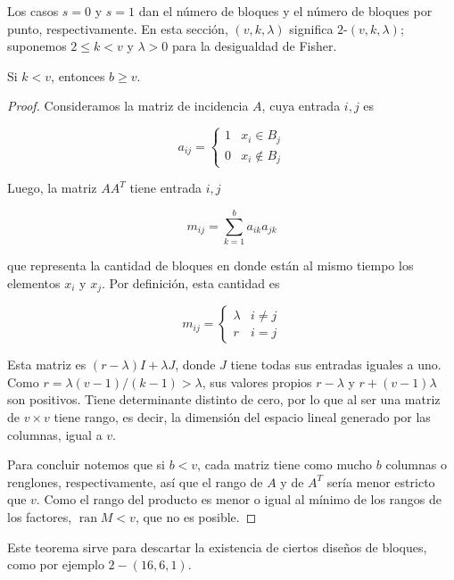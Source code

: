 Los casos $s=0$ y $s=1$ dan el número de
bloques y el número de bloques por punto,
respectivamente.
En esta sección, $(v,k,\lambda)$ significa
$2$-$(v,k,\lambda)$; suponemos $2\leq k<v$ y
$\lambda>0$ para la desigualdad de Fisher.
\begin{theorem}
\label{theorem-combi-022}
Si $k<v$, entonces $b\geq v$.
\end{theorem}
\begin{proof}
Consideramos la matriz de incidencia $A$,
cuya entrada $i,j$ es

$$
a_{ij}=\begin{cases}
1 & x_i\in B_j\\
0 & x_i\notin B_j
\end{cases}
$$

Luego, la matriz $AA^T$ tiene entrada $i,j$

$$
m_{ij}=\sum_{k=1}^ba_{ik}a_{jk}
$$

que representa la cantidad de bloques en
donde están al mismo tiempo los elementos
$x_i$ y $x_j$. Por definición, esta cantidad
es

$$
m_{ij}=\begin{cases}
\lambda & i\neq j\\
r & i=j
\end{cases}
$$

Esta matriz es $(r-\lambda)I + \lambda J$,
donde $J$ tiene todas sus entradas iguales a
uno. Como $r = \lambda(v-1)/(k-1)>\lambda$,
sus valores propios $r-\lambda$ y $r +
(v-1)\lambda$ son positivos. Tiene
determinante distinto de cero, por lo que al
ser una matriz de $v\times v$ tiene rango, es
decir, la dimensión del espacio lineal
generado por las columnas, igual a $v$.

Para concluir notemos que si $b<v$, cada
matriz tiene como mucho $b$ columnas o
renglones, respectivamente, así que el rango
de $A$ y de $A^T$ sería menor estricto que
$v$. Como el rango del producto es menor o
igual al mínimo de los rangos de los
factores, $ \operatorname{ran} M<v$, que no
es posible.
\end{proof}
Este teorema sirve para descartar la
existencia de ciertos diseños de bloques,
como por ejemplo $2-(16,6,1)$.


